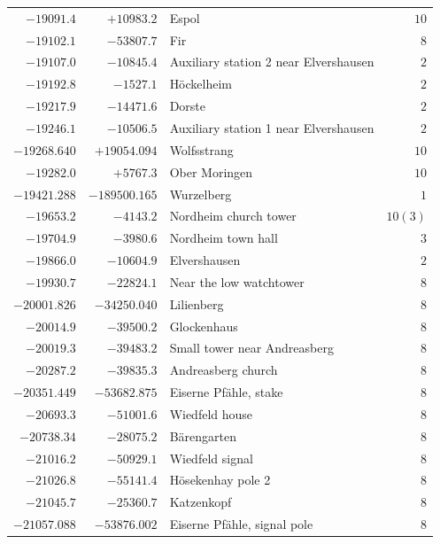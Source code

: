 \begin{center}
\begin{tabular}{r|r|p{170pt}|r}
\(-19091.4\)&\(+10983.2\)&Espol&\(10\)\\
\(-19102.1\)&\(-53807.7\)&Fir&\(8\)\\
\(-19107.0\)&\(-10845.4\)&Auxiliary station 2 near Elvershausen&\(2\)\\
\(-19192.8\)&\(-1527.1\)&Höckelheim&\(2\)\\
\(-19217.9\)&\(-14471.6\)&Dorste&\(2\)\\
\(-19246.1\)&\(-10506.5\)&Auxiliary station 1 near Elvershausen&\(2\)\\
\(-19268.640\)&\(+19054.094\)&Wolfsstrang&\(10\)\\
\(-19282.0\)&\(+5767.3\)&Ober Moringen&\(10\)\\
\(-19421.288\)&\(-189500.165\)&Wurzelberg&\(1\)\\
\(-19653.2\)&\(-4143.2\)&Nordheim church tower&\(10 (3)\)\\
\(-19704.9\)&\(-3980.6\)&Nordheim town hall&\(3\)\\
\(-19866.0\)&\(-10604.9\)&Elvershausen&\(2\)\\
\(-19930.7\)&\(-22824.1\)&Near the low watchtower&\(8\)\\
\(-20001.826\)&\(-34250.040\)&Lilienberg&\(8\)\\
\(-20014.9\)&\(-39500.2\)&Glockenhaus&\(8\)\\
\(-20019.3\)&\(-39483.2\)&Small tower near Andreasberg&\(8\)\\
\(-20287.2\)&\(-39835.3\)&Andreasberg church&\(8\)\\
\(-20351.449\)&\(-53682.875\)&Eiserne Pfähle, stake&\(8\)\\
\(-20693.3\)&\(-51001.6\)&Wiedfeld house&\(8\)\\
\(-20738.34\)&\(-28075.2\)&Bärengarten&\(8\)\\
\(-21016.2\)&\(-50929.1\)&Wiedfeld signal&\(8\)\\
\(-21026.8\)&\(-55141.4\)&Hösekenhay pole 2&\(8\)\\
\(-21045.7\)&\(-25360.7\)&Katzenkopf&\(8\)\\
\(-21057.088\)&\(-53876.002\)&Eiserne Pfähle, signal pole&\(8\)\\
\hline\end{tabular}\endgroup\end{center}
